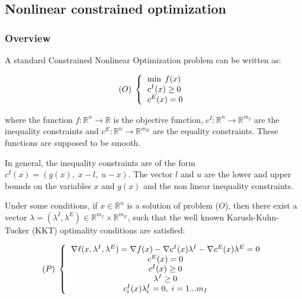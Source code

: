 \subsection{Nonlinear constrained optimization}
\subsubsection{Overview}

A standard Constrained Nonlinear Optimization problem can be written as:

\begin{equation*}
  (O)\;
  \left\{
    \begin{tabular}{l}
      $\displaystyle   \min \; f(x)$ \\
      $\displaystyle c^I(x) \geq 0$ \\
      $\displaystyle c^E(x) = 0$
    \end{tabular}
  \right.
\end{equation*}

where the function $f : \mathbb{R}^n \rightarrow  \mathbb{R}$ is the objective function, $c^I : \mathbb{R}^n \rightarrow  \mathbb{R}^{m_I} $ are the inequality constraints and $c^E : \mathbb{R}^n \rightarrow  \mathbb{R}^{m_E} $ are the equality constraints. These functions are supposed to be smooth.

In general, the inequality constraints are of the form $c^I(x) = \left (g(x), \; x-l, \; u-x \right )$. The vector $l$ and $u$ are the lower and upper bounds on the variables $x$ and $g(x)$ and the non linear inequality constraints.

Under some conditions, if $x \in \mathbb{R}^n$ is a solution of problem ($O$), then there exist a vector $\lambda=(\lambda^I,\lambda^E) \in \mathbb{R}^{m_I} \times \mathbb{R}^{m_E}$, such that the well known Karush-Kuhn-Tucker (KKT) optimality conditions are satisfied:

\begin{equation*}
  (P)\;
  \left\{
    \begin{tabular}{c}
      $\nabla \ell(x,\lambda^I, \lambda^E) = \nabla f(x) - \nabla c^I(x) \lambda^I - \nabla c^E(x) \lambda^E= 0$ \\
      $c^E(x) = 0 $ \\
      $c^I(x) \geq 0 $ \\
      $\lambda^I \geq 0 $\\
      $c^I_i(x) \lambda^I_i =0, \; i=1...m_I$ \\
    \end{tabular}
  \right.
\end{equation*}


